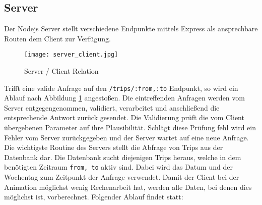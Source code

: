 \subsection{Server}
\label{sub:server}
  Der Nodejs Server stellt verschiedene Endpunkte mittels Express als ansprechbare Routen dem Client zur Verfügung. 

  \begin{figure}[htbp]
    \begin{center}
      \texttt{[image: server\_client.jpg]}
      \caption{Server / Client Relation}
      \label{fig:server_client}
    \end{center}
  \end{figure}

  Trifft eine valide Anfrage auf den \texttt{/trips/:from,:to} Endpunkt, so wird ein Ablauf nach Abbildung \ref{fig:server_client} angestoßen.
  Die eintreffenden Anfragen werden vom Server entgegengenommen, validiert, verarbeitet und anschließend die entsprechende Antwort zurück gesendet. Die Validierung prüft die vom Client übergebenen Parameter auf ihre Plausibilität. Schlägt diese Prüfung fehl wird ein Fehler vom Server zurückgegeben und der Server wartet auf eine neue Anfrage. Die wichtigste Routine des Servers stellt die Abfrage von Trips aus der Datenbank dar. Die Datenbank sucht diejenigen Trips heraus, welche in dem benötigten Zeitraum \texttt{from, to} aktiv sind. Dabei wird das Datum und der Wochentag zum Zeitpunkt der Anfrage verwendet. Damit der Client bei der Animation möglichst wenig Rechenarbeit hat, werden alle Daten, bei denen dies möglichst ist, vorberechnet. Folgender Ablauf findet statt:

